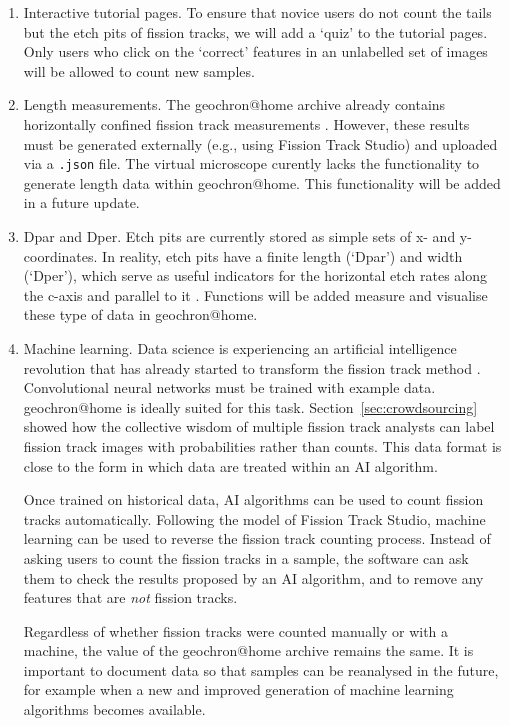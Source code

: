 \documentclass[gchron, manuscript]{copernicus}
\begin{document}
\begin{enumerate}
\item Interactive tutorial pages. To ensure that novice users do not
  count the tails but the etch pits of fission tracks, we will add a
  `quiz' to the tutorial pages. Only users who click on the `correct'
  features in an unlabelled set of images will be allowed to count new
  samples.
\item Length measurements. The geochron@home archive already
  contains horizontally confined fission track measurements
  \citep{tamer2025}.  However, these results must be generated
  externally (e.g., using Fission Track Studio) and uploaded via a
  \texttt{.json} file.  The virtual microscope curently lacks the
  functionality to generate length data within
  geochron@home. This functionality will be added in a future
  update.
\item Dpar and Dper. Etch pits are currently stored as simple sets of
  x- and y-coordinates.  In reality, etch pits have a finite length
  (`Dpar') and width (`Dper'), which serve as useful indicators for
  the horizontal etch rates along the c-axis and parallel to it
  \citep{donelick1993}. Functions will be added measure and visualise
  these type of data in geochron@home.
\item Machine learning. Data science is experiencing an artificial
  intelligence revolution that has already started to transform the
  fission track method \citep{nachtergaele2020}.  Convolutional neural
  networks must be trained with example data. geochron@home
  is ideally suited for this task. Section~\ref{sec:crowdsourcing}
  showed how the collective wisdom of multiple fission track analysts
  can label fission track images with probabilities rather than
  counts. This data format is close to the form in which data are
  treated within an AI algorithm.\medskip

  Once trained on historical data, AI algorithms can be used to count
  fission tracks automatically. Following the model of Fission Track
  Studio, machine learning can be used to reverse the fission track
  counting process. Instead of asking users to count the fission
  tracks in a sample, the software can ask them to check the results
  proposed by an AI algorithm, and to remove any features that are
  \emph{not} fission tracks.\medskip

  Regardless of whether fission tracks were counted manually or with a
  machine, the value of the geochron@home archive remains the
  same. It is important to document data so that samples can be
  reanalysed in the future, for example when a new and improved
  generation of machine learning algorithms becomes available.
\end{enumerate}
\end{document}
